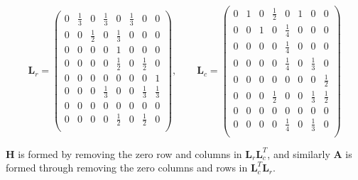 \documentclass[11pt]{report}
\begin{document}
\begin{equation*} \renewcommand*{\arraystretch}{1.25}
\textbf{L}_r=\left(
\begin{array}{cccccccc}
0 & \frac{1}{3} & 0 & \frac{1}{3} & 0 & \frac{1}{3} & 0 & 0 \\
0 & 0 & \frac{1}{2} & 0 & \frac{1}{3} & 0 & 0 & 0 \\
0 & 0 & 0 & 0 & 1 & 0 & 0 & 0\\
0 & 0 & 0 & 0 & \frac{1}{2} & 0 & \frac{1}{2} & 0 \\
0 & 0 & 0 & 0 & 0 & 0 & 0 & 1 \\
0 & 0 & 0 & \frac{1}{3} & 0 & 0 & \frac{1}{3} & \frac{1}{3} \\
0 & 0 & 0 & 0 & 0 & 0 & 0 & 0 \\
0 & 0 & 0 & 0 & \frac{1}{2} & 0 & \frac{1}{2} & 0 \\
\end{array}
\right)
\mathrm{,}\qquad
\textbf{L}_c=\left(
\begin{array}{cccccccc} 
0 & 1 & 0 & \frac{1}{2} & 0 & 1 & 0 & 0 \\
0 & 0 & 1 & 0 & \frac{1}{4} & 0 & 0 & 0 \\
0 & 0 & 0 & 0 & \frac{1}{4} & 0 & 0 & 0 \\
0 & 0 & 0 & 0 & \frac{1}{4} & 0 & \frac{1}{3} & 0 \\
0 & 0 & 0 & 0 & 0 & 0 & 0 & \frac{1}{2} \\
0 & 0 & 0 & \frac{1}{2} & 0 & 0 & \frac{1}{3} & \frac{1}{2} \\
0 & 0 & 0 & 0 & 0 & 0 & 0 & 0 \\
0 & 0 & 0 & 0 & \frac{1}{4} & 0 & \frac{1}{3} & 0 \\
\end{array}
\right)
\end{equation*}

\textbf{H} is formed by removing the zero row and columns in $\textbf{L}_r\textbf{L}_c^T$, and similarly \textbf{A} is formed through removing the zero columns and rows in $\textbf{L}_c^T\textbf{L}_r$.
\end{document}
